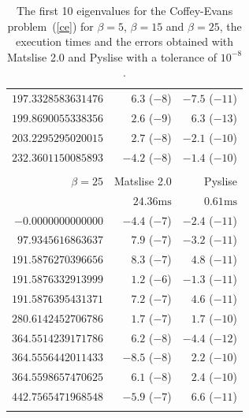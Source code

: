 \begin{table}
\begin{center}
\begin{tabular}[]{rrr}
            $197.3328583631476$ & $6.3$ ($-8$)     & $-7.5$ ($-11$)  \\
            $199.8690055338356$ & $2.6$ ($-9$)     & $6.3$ ($-13$)   \\
            $203.2295295020015$ & $2.7$ ($-8$)     & $-2.1$ ($-10$)  \\
            $232.3601150085893$ & $-4.2$ ($-8$)    & $-1.4$ ($-10$)  \\
                                &                  &                 \\
            \bottomrule
            \toprule
            $\beta=25$          & Matslise 2.0     & Pyslise         \\
            \midrule
                                & $24.36\text{ms}$ & $0.61\text{ms}$ \\
            $-0.0000000000000$  & $-4.4$ ($-7$)    & $-2.4$ ($-11$)  \\
            $97.9345616863637$  & $7.9$ ($-7$)     & $-3.2$ ($-11$)  \\
            $191.5876270396656$ & $8.3$ ($-7$)     & $4.8$ ($-11$)   \\
            $191.5876332913999$ & $1.2$ ($-6$)     & $-1.3$ ($-11$)  \\
            $191.5876395431371$ & $7.2$ ($-7$)     & $4.6$ ($-11$)   \\
            $280.6142452706786$ & $1.7$ ($-7$)     & $1.7$ ($-10$)   \\
            $364.5514239171786$ & $6.2$ ($-8$)     & $-4.4$ ($-12$)  \\
            $364.5556442011433$ & $-8.5$ ($-8$)    & $2.2$ ($-10$)   \\
            $364.5598657470625$ & $6.1$ ($-8$)     & $2.4$ ($-10$)   \\
            $442.7565471968548$ & $-5.9$ ($-7$)    & $6.6$ ($-11$)   \\
                                &                  &                 \\
            \bottomrule
        \end{tabular}
    \end{center}
    \caption{\label{tab:c2_tab4}The first 10 eigenvalues for the Coffey-Evans problem~(\ref{ce}) for $\beta=5$, $\beta=15$ and $\beta=25$, the execution times and the errors obtained with Matslise 2.0 and Pyslise with a tolerance of $10^{-8}$.}
\end{table}

